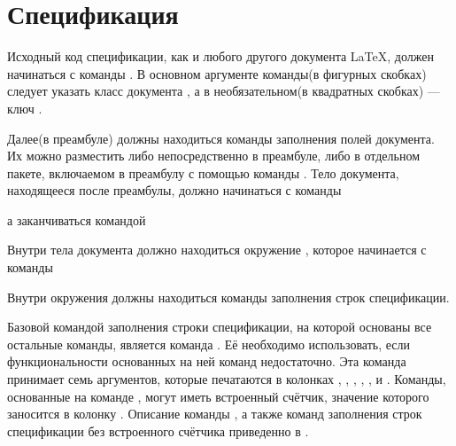 
\section{Спецификация}

Исходный код спецификации, как и любого другого документа \LaTeX{}, должен
начинаться с команды . В основном аргументе
команды(в фигурных скобках) следует указать класс документа , а в
необязательном(в квадратных скобках) --- ключ .


Далее(в преамбуле) должны находиться команды заполнения полей документа. Их можно
разместить либо непосредственно в преамбуле, либо в отдельном пакете, включаемом в
преамбулу с помощью команды . Тело документа,
находящееся после преамбулы, должно начинаться с команды

\begin{pcbdoccode}

\end{pcbdoccode}

а заканчиваться командой

\begin{pcbdoccode}

\end{pcbdoccode}

Внутри тела документа должно находиться
окружение , которое начинается с команды

\begin{pcbdoccode}
\end{pcbdoccode}

Внутри окружения  должны находиться команды заполнения строк
спецификации.

Базовой командой заполнения строки спецификации, на которой основаны все остальные
команды, является команда . Её необходимо использовать,
если функциональности основанных на ней команд недостаточно. Эта команда принимает семь
аргументов, которые печатаются в колонках
\colorbox{resultcolor}{}, \colorbox{resultcolor}{},
\colorbox{resultcolor}{}, \colorbox{resultcolor}{},
\colorbox{resultcolor}{}, \colorbox{resultcolor}{} и
\colorbox{resultcolor}{}. Команды, основанные на
команде , могут иметь встроенный счётчик, значение которого
заносится в колонку \colorbox{resultcolor}{}. Описание команды
, а также команд заполнения строк спецификации без
встроенного счётчика приведенно в .

